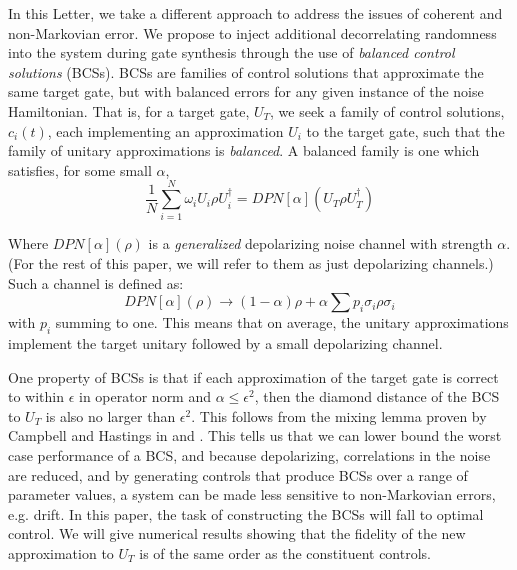 \documentclass[aps,nofootinbib,pra,notitlepage,twocolumn]{revtex4-1}
\begin{document}
In this Letter, we take a different approach to address the issues of coherent and non-Markovian error. We propose to inject additional decorrelating randomness into the system during gate synthesis through the use of \emph{balanced control solutions} (BCSs). BCSs are families of control solutions that approximate the same target gate, but with balanced errors for any given instance of the noise Hamiltonian. That is, for a target gate, $U_T$, we seek a family of control solutions, $c_i(t)$, each implementing an approximation $U_i$ to the target gate, such that the family of unitary approximations is \emph{balanced}. A balanced family is one which satisfies, for some small $\alpha$,
\begin{equation}\label{eq:1}
  \frac{1}{N}\sum_{i=1}^N \omega_i U_i \rho U_i^\dagger = DPN[\alpha]\left(U_T \rho U_T^\dagger \right)
\end{equation}

Where $DPN[\alpha](\rho)$ is a \textit{generalized} depolarizing noise channel with strength $\alpha$. (For the rest of this paper, we will refer to them as just depolarizing channels.) Such a channel is defined as:
\begin{equation}\label{eq:2}
  DPN[\alpha](\rho) \rightarrow (1-\alpha)\rho + \alpha\sum p_i \sigma_i\rho\sigma_i
\end{equation}
with $p_i$ summing to one. This means that on average, the unitary approximations implement the target unitary followed by a small depolarizing channel. 

One property of BCSs is that if each approximation of the target gate is correct to within $\epsilon$ in operator norm and $\alpha\leq\epsilon^2$, then the diamond distance of the BCS to $U_T$ is also no larger than $\epsilon^2$. This follows from the mixing lemma proven by Campbell and Hastings in \cite{Campbell2017} and \cite{1612.01011}. This tells us that we can lower bound the worst case performance of a BCS, and because  depolarizing, correlations in the noise are reduced, and by generating controls that produce BCSs over a range of parameter values, a system can be made less sensitive to non-Markovian errors, e.g. drift. In this paper, the task of constructing the BCSs will fall to optimal control. We will give numerical results showing that the fidelity of the new approximation to $U_T$ is of the same order as the constituent controls.
\end{document}
